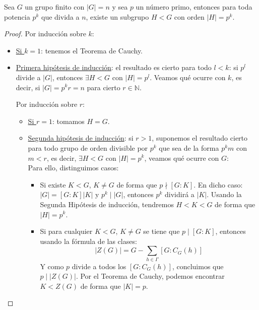\begin{teo}\label{teo:subgrupo_potencia_p}
    Sea $G$ un grupo finito con $|G| = n$ y sea $p$ un número primo, entonces para toda potencia $p^k$ que divida a $n$, existe un subgrupo $H<G$ con orden $|H| = p^k$.
    \begin{proof}
        Por inducción sobre $k$:
        \begin{itemize}
            \item \underline{Si $k = 1$}: tenemos el Teorema de Cauchy.
            \item \underline{Primera hipótesis de inducción}: el resultado es cierto para todo $l<k$: si $p^l$ divide a $|G|$, entonces $\exists H<G$ con $|H| = p^l$. \newline Veamos qué ocurre con $k$, es decir, si ${|G| = p^kr = n}$ para cierto $r\in \mathbb{N}$.

                Por inducción sobre $r$:
                \begin{itemize}
                    \item \underline{Si $r=1$}: tomamos $H = G$.
                    \item \underline{Segunda hipótesis de inducción}: si $r>1$, suponemos el resultado cierto para todo grupo de orden divisible por $p^k$ que sea de la forma $p^k m$ con $m<r$, es decir, $\exists H<G$ con $|H| = p^k$, veamos qué ocurre con $G$:\\

                        Para ello, distinguimos casos:
                        \begin{itemize}
                            \item Si existe $K<G$, $K \neq G$ de forma que $p\nmid [G:K]$. En dicho caso: $|G| = [G:K]|K|$ y $p^k \mid |G|$, entonces $p^k$ dividirá a $|K|$. Usando la Segunda Hipótesis de inducción, tendremos $H<K<G$ de forma que $|H| = p^k$.
                            \item Si para cualquier $K<G$, $K\neq G$ se tiene que $p\mid [G:K]$, entonces usando la fórmula de las clases:
                                \begin{equation*}
                                    |Z(G)| = G - \sum_{h\in \Gamma} [G:C_G(h)]
                                \end{equation*}
                                Y como $p$ divide a todos los $[G:C_G(h)]$, concluimos que $p \mid |Z(G)|$. Por el Teorema de Cauchy, podemos encontrar $K<Z(G)$ de forma que $|K| = p$.


\end{itemize}
\end{itemize}
\end{itemize}
\end{proof}
\end{teo}

